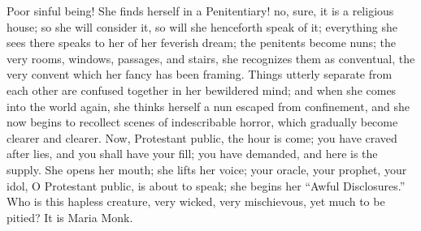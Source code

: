 Poor sinful being! She finds herself in a
Penitentiary! no, sure, it is a religious house; so she
will consider it, so will she henceforth speak of it;
everything she sees there speaks to her of her feverish
dream; the penitents become nuns; the very rooms,
windows, passages, and stairs, she recognizes them as
conventual, the very convent which her fancy has been
framing. Things utterly separate from each other are
confused together in her bewildered mind; and when she
comes into the world again, she thinks herself a nun
escaped from confinement, and she now begins to recollect
scenes of indescribable horror, which gradually become
clearer and clearer. Now, Protestant public, the hour is
come; you have craved after lies, and you shall have your
fill; you have demanded, and here is the supply. She
opens her mouth; she lifts her voice; your oracle, your
prophet, your idol, O Protestant public, is about to
speak; she begins her ``Awful Disclosures.'' Who
is this hapless creature, very wicked, very mischievous,
yet much to be pitied? It is Maria Monk.

